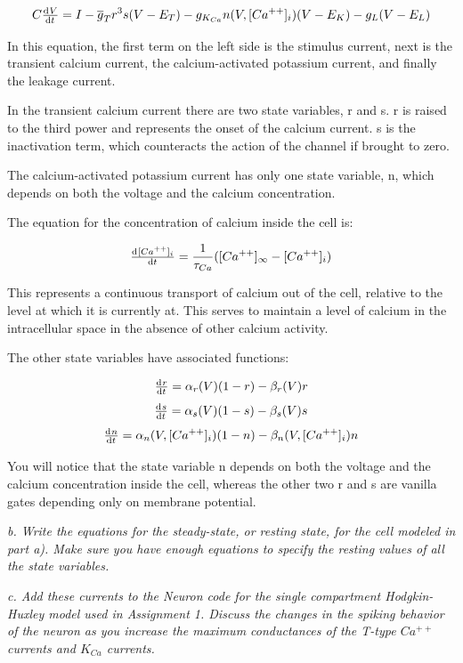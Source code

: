 \documentclass[12pt]{article}
\begin{document}
$$ C\od{V}{t}=I-\overline{g}_Tr^3s(V-E_T)-g_{K_{Ca}}n(V,[Ca^{++}]_i)(V-E_K)-g_L(V-E_L) $$

In this equation, the first term on the left side is the stimulus current, next is the transient calcium current, the calcium-activated potassium current, and finally the leakage current.  

In the transient calcium current there are two state variables, r and s.  r is raised to the third power and represents the onset of the calcium current.  s is the inactivation term, which counteracts the action of the channel if brought to zero.

The calcium-activated potassium current has only one state variable, n, which depends on both the voltage and the calcium concentration.  

The equation for the concentration of calcium inside the cell is:

$$ \od{[Ca^{++}]_i}{t}=\frac{1}{\tau_{Ca}}([Ca^{++}]_{\infty}-[Ca^{++}]_i) $$

This represents a continuous transport of calcium out of the cell, relative to the level at which it is currently at.  This serves to maintain a level of calcium in the intracellular space in the absence of other calcium activity.  

The other state variables have associated functions:

$$ \od{r}{t}=\alpha_r(V)(1-r)-\beta_r(V)r $$
$$ \od{s}{t}=\alpha_s(V)(1-s)-\beta_s(V)s $$
$$ \od{n}{t}=\alpha_n(V,[Ca^{++}]_i)(1-n)-\beta_n(V,[Ca^{++}]_i)n $$

You will notice that the state variable n depends on both the voltage and the calcium concentration inside the cell, whereas the other two r and s are vanilla gates depending only on membrane potential.

\vspace{10pt}

\emph{b.  Write the equations for the steady-state, or resting state, for the cell modeled in part a). Make sure you have enough equations to specify the resting values of all the state variables.}

\vspace{10pt}



\vspace{10pt}

\emph{c.  Add these currents to the Neuron code for the single compartment Hodgkin-Huxley model used in Assignment 1. Discuss the changes in the spiking behavior of the neuron as you increase the maximum conductances of the T-type $Ca^{++}$ currents and $K_{Ca}$ currents.}

\vspace{10pt}
\end{document}
